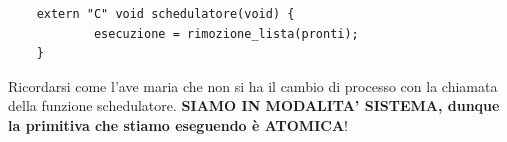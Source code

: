 \documentclass[11pt]{report}
\theoremstyle{definition}
\begin{document}
\begin{itemize}
\begin{itemize}
\begin{framed}
\begin{itemize}
\begin{verbatim}
	extern "C" void schedulatore(void) {
		    esecuzione = rimozione_lista(pronti);	
	}
\end{verbatim}
		\end{itemize}
	Ricordarsi come l'ave maria che non si ha il cambio di processo con la chiamata della funzione schedulatore. \textbf{SIAMO IN MODALITA' SISTEMA, dunque la primitiva che stiamo eseguendo è ATOMICA}!\end{framed}
		\end{itemize}
	\end{itemize}




%
\end{document}
